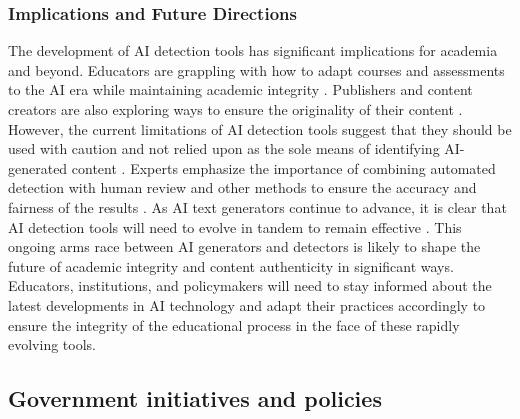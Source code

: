 \documentclass{article}
\begin{document}
\subsubsection{Implications and Future Directions}
The development of AI detection tools has significant implications for academia
and beyond. Educators are grappling with how to adapt courses and assessments
to the AI era while maintaining academic integrity
\cite{scribbr_ai_detectors}
\cite{kb_iu_chatgpt}. Publishers and content creators are
also exploring ways to ensure the originality of their content
\cite{scribbr_ai_detectors}.
However, the current limitations of AI detection tools suggest that they
should be used with caution and not relied upon as the sole means of
identifying AI-generated content \cite{biomedcentral_ai_detection_variation}
\cite{biomedcentral_ai_detection}
\cite{kb_iu_chatgpt}. Experts emphasize the importance of
combining automated detection with human review and other methods to ensure
the accuracy and fairness of the results \cite{biomedcentral_ai_detection_variation}
\cite{biomedcentral_ai_detection}.
As AI text generators continue to advance, it is clear that AI detection tools will
need to evolve in tandem to remain effective \cite{surferseo_ai_content_detectors}
\cite{contadu_ai_detection}
\cite{biomedcentral_ai_detection}.
This ongoing arms race between AI generators and detectors is likely to shape
the future of academic integrity and content authenticity in significant ways.
Educators, institutions, and policymakers will need to stay informed about the
latest developments in AI technology and adapt their practices accordingly to
ensure the integrity of the educational process in the face of these rapidly evolving tools.


\subsection{Government initiatives and policies}
\end{document}
